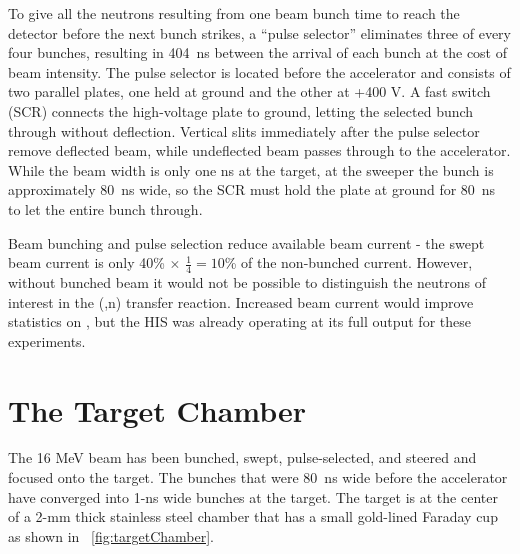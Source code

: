 To give all the neutrons resulting from one beam bunch time to reach the detector before the next bunch strikes, a ``pulse selector'' eliminates three of every four bunches, resulting in 404~ns between the arrival of each bunch at the cost of beam intensity.  The pulse selector is located before the accelerator and consists of two parallel plates, one held at ground and the other at +400 V.  A fast switch (SCR) connects the high-voltage plate to ground, letting the selected bunch through without deflection.  Vertical slits immediately after the pulse selector remove deflected beam, while undeflected beam passes through to the accelerator.  While the beam width is only one ns at the target, at the sweeper the bunch is approximately 80~ns wide, so the SCR must hold the plate at ground for 80~ns to let the entire bunch through.

Beam bunching and pulse selection reduce available beam current - the swept beam current is only 40\% $\times$ $\frac{1}{4} = 10$\% of the non-bunched current.  However, without bunched beam it would not be possible to distinguish the neutrons of interest in the (,n) transfer reaction.  Increased beam current would improve statistics on \reaction, but the HIS was already operating at its full output for these experiments.

\section{The Target Chamber}

The 16 MeV  beam has been bunched, swept, pulse-selected, and steered and focused onto the target.  The bunches that were 80~ns wide before the accelerator have converged into 1-ns wide bunches at the target.  The target is at the center of a 2-mm thick stainless steel chamber that has a small gold-lined Faraday cup as shown in {\fig}~\ref{fig:targetChamber}.

